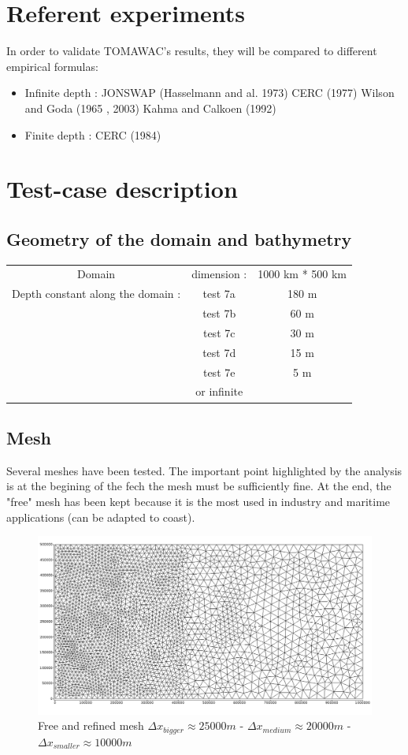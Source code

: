 \documentclass[10pt]{article}
\begin{document}
\section{Referent experiments}
In order to validate TOMAWAC's results, they will be compared to different empirical formulas:
\begin{itemize}
\item Infinite depth :
\subitem JONSWAP (Hasselmann and al. 1973)
\subitem CERC (1977)
\subitem Wilson and Goda (1965 , 2003)
\subitem Kahma and Calkoen (1992)
\item Finite depth :
\subitem CERC (1984)
\end{itemize}
\section{Test-case description}

\subsection{Geometry of the domain and bathymetry}
\begin{tabular}{ccc}
Domain & dimension :& 1000 km * 500 km\\
 Depth constant along the domain :& test 7a & 180 m\\
 & test 7b & 60 m\\
& test 7c & 30 m\\
& test 7d & 15 m\\
& test 7e & 5 m\\
 & or infinite\\
\end{tabular}
\subsection{Mesh}
Several meshes have been tested. The important point highlighted by the analysis is at the begining of the fech the mesh must be sufficiently fine. At the end, the "free" mesh has been kept because it is the most used in industry and maritime applications (can be adapted to coast).
\quad \vspace{3cm}
\begin{figure}[H]
  \centering
    \includegraphics[scale = 0.35]{freemesh.png}
      \caption{Free and refined mesh $\Delta x_{bigger} \approx 25 000 m$ - $\Delta x_{medium} \approx 20 000 m$ - $\Delta x_{smaller} \approx 10 000 m$}
\end{figure}
\end{document}
